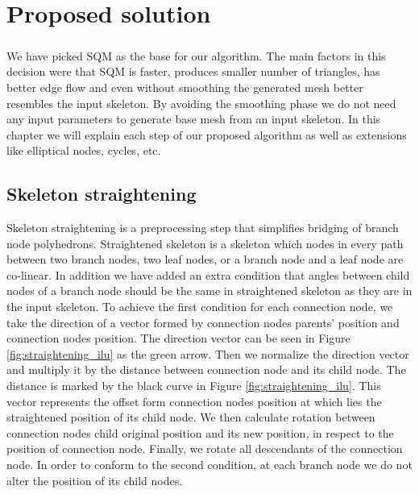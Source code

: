 \chapter{Proposed solution}\label{ch:proposed_solution}
\paragraph{}
We have picked SQM as the base for our algorithm. The main factors in this decision were that SQM is faster, produces smaller number of triangles, has better edge flow and even without smoothing the generated mesh better resembles the input skeleton. By avoiding the smoothing phase we do not need any input parameters to generate base mesh from an input skeleton. In this chapter we will explain each step of our proposed algorithm as well as extensions like elliptical nodes, cycles, etc.

\section{Skeleton straightening}\label{sec:straight}
Skeleton straightening is a preprocessing step that simplifies bridging of branch node polyhedrons. Straightened skeleton is a skeleton which nodes in every path between two branch nodes, two leaf nodes, or a branch node and a leaf node are co-linear. In addition we have added an extra condition that angles between child nodes of a branch node should be the same in straightened skeleton as they are in the input skeleton. To achieve the first condition for each connection node, we take the direction of a vector formed by connection nodes parents’ position and connection nodes position. The direction vector can be seen in Figure \ref{fig:straightening_ilu} as the green arrow. Then we normalize the direction vector and multiply it by the distance between connection node and its child node. The distance is marked by the black curve in Figure \ref{fig:straightening_ilu}. This vector represents the offset form connection nodes position at which lies the straightened position of its child node. We then calculate rotation between connection nodes child original position and its new position, in respect to the position of connection node. Finally, we rotate all descendants of the connection node. In order to conform to the second condition, at each branch node we do not alter the position of its child nodes.

